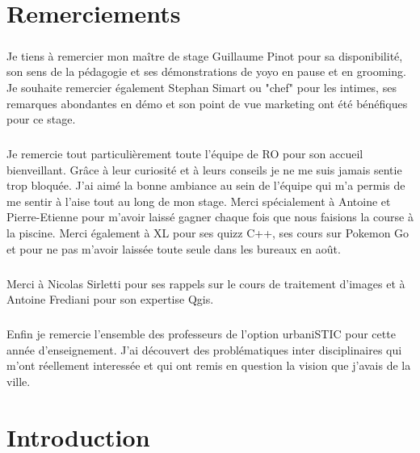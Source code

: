\documentclass[a4paper]{report}
\begin{document}
\chapter*{Remerciements}

\paragraph{} Je tiens à remercier mon maître de stage Guillaume Pinot pour sa disponibilité, son sens de la pédagogie et ses démonstrations de yoyo en pause et en grooming.  Je souhaite remercier également Stephan Simart ou "chef" pour les intimes, ses remarques abondantes en démo et son point de vue marketing ont été bénéfiques pour ce stage.

\paragraph{} Je remercie tout particulièrement toute l'équipe de RO pour son accueil bienveillant. Grâce à leur curiosité et à leurs conseils je ne me suis jamais sentie trop bloquée. J'ai aimé la bonne ambiance au sein de l'équipe qui m'a permis de me sentir à l'aise tout au long de mon stage. Merci spécialement à Antoine et Pierre-Etienne pour m'avoir laissé gagner chaque fois que nous faisions la course à la piscine. Merci également à XL pour ses quizz C++, ses cours sur Pokemon Go et pour ne pas m'avoir laissée toute seule dans les bureaux en août.

\paragraph{} Merci à Nicolas Sirletti pour ses rappels sur le cours de traitement d'images et à Antoine Frediani pour son expertise Qgis.

\paragraph{} Enfin je remercie l'ensemble des professeurs de l'option urbaniSTIC pour cette année d'enseignement. J'ai découvert des problématiques inter disciplinaires qui m'ont réellement interessée et qui ont remis en question la vision que j'avais de la ville.	

\newpage

\chapter*{Introduction}
	
\end{document}
